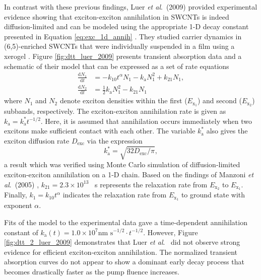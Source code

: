 In contrast with these previous findings, Luer \textit{et al}.\ (2009) provided experimental evidence showing that exciton-exciton annihilation in SWCNTs is indeed diffusion-limited and can be modeled using the appropriate 1-D decay constant presented in Equation \eqref{eq:exc_1d_annih} \cite{luer2009size}. They studied carrier dynamics in (6,5)-enriched SWCNTs that were individually suspended in a film using a xerogel \cite{luer2009size}. Figure \ref{fig:dtt_luer_2009} presents transient absorption data and a schematic of their model that can be expressed as a set of rate equations
%
\begin{equation}
	\begin{split}
			\frac{\mathrm{d} N_1}{\mathrm{d} t} &= -k_{10} t^{\alpha} N_1 - k_\text{a}N_1^2 + k_{21} N_1,
			\\
			\frac{\mathrm{d} N_2}{\mathrm{d} t} &= \frac{1}{2} k_\text{a} N_1^2 - k_{21} N_1
	\end{split}
\end{equation}
%
where $N_1$ and $N_2$ denote exciton densities within the first ($E_{\text{x}_1}$) and second ($E_{\text{x}_2}$) subbands, respectively. The exciton-exciton annihilation rate is given as $k_\text{a} = k_\text{a}^* t^{-1/2}$. Here, it is assumed that annihilation occurs immediately when two excitons make sufficient contact with each other. The variable $k_\text{a}^*$ also gives the exciton diffusion rate $D_\text{exc}$ via the expression
\begin{equation}
	k_\text{a}^* = \sqrt{32 D_\text{exc}/ \pi},
	\label{eq:exc_anih_diffuse_luer_2009}
\end{equation}
a result which was verified using Monte Carlo simulation of diffusion-limited exciton-exciton annihilation on a 1-D chain. Based on the findings of Manzoni \textit{et al}.\ (2005) \cite{manzoni2005intersubband}, $k_{21} = 2.3 \times 10^{13}$ \si{\per\second} represents the relaxation rate from $ E_{\text{x}_2} $ to $E_{\text{x}_1}$. Finally, $k_{1} = k_{10}t^\alpha $ indicates the relaxation rate from $E_{\text{x}_1}$ to ground state with exponent $\alpha$.

Fits of the model to the experimental data gave a time-dependent annihilation constant of $k_\text{a}(t) = 1.0 \times 10^7 \text{nm } \text{s}^{-1/2} \cdot t^{-1/2}$. However, Figure \ref{fig:dtt_2_luer_2009} demonstrates that Luer \textit{et al}.\ \cite{luer2009size} did not observe strong evidence for efficient exciton-exciton annihilation. The normalized transient absorption curves do not appear to show a dominant early decay process that becomes drastically faster as the pump fluence increases.


